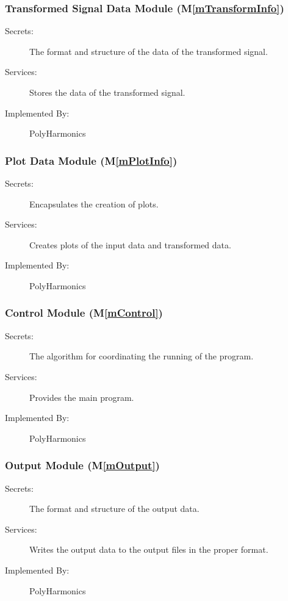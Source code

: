 \documentclass[12pt]{article}
\newcommand{\mref}[1]{M\ref{#1}}
\newcommand{\progname}{PolyHarmonics}
\begin{document}
\subsubsection{Transformed Signal Data Module (\mref{mTransformInfo})}
\begin{description}
\item[Secrets:] The format and structure of the data of the transformed signal.
\item[Services:] Stores the data of the transformed signal.
\item[Implemented By:] \progname{}
\end{description}

\subsubsection{Plot Data Module (\mref{mPlotInfo})}
\begin{description}
\item[Secrets:] Encapsulates the creation of plots.
\item[Services:] Creates plots of the input data and transformed data.
\item[Implemented By:] \progname{}
\end{description}

\subsubsection{Control Module (\mref{mControl})}
\begin{description}
\item[Secrets:] The algorithm for coordinating the running of the program.
\item[Services:] Provides the main program.
\item[Implemented By:] \progname{}
\end{description}

\subsubsection{Output Module (\mref{mOutput})}
\begin{description}
\item[Secrets:] The format and structure of the output data.
\item[Services:] Writes the output data to the output files in the proper 
format.
\item[Implemented By:] \progname{}
\end{description}
\end{document}

